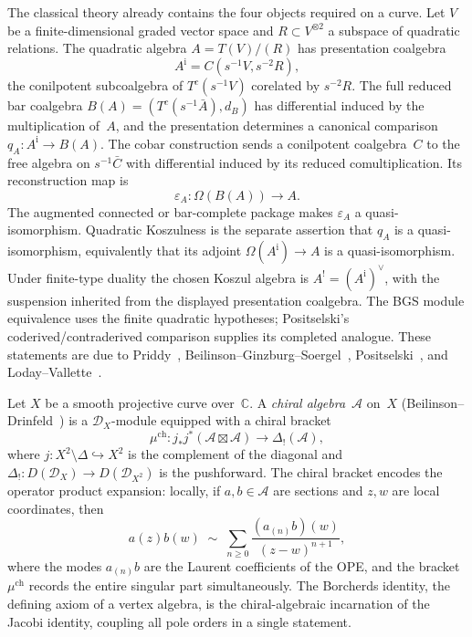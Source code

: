 \documentclass[11pt]{report}
\theoremstyle{definition}
\theoremstyle{remark}
\providecommand{\cA}{\mathcal{A}}
\numberwithin{equation}{section}
\begin{document}
The classical theory already contains the four objects required on a
curve.  Let $V$ be a finite-dimensional graded vector space and
$R\subset V^{\otimes2}$ a subspace of quadratic relations.  The
quadratic algebra $A=T(V)/(R)$ has presentation coalgebra
\[
A^{\mathrm i}=C(s^{-1}V,s^{-2}R),
\]
the conilpotent subcoalgebra of $T^c(s^{-1}V)$ corelated by
$s^{-2}R$.  The full reduced bar coalgebra
$B(A)=(T^c(s^{-1}\bar A),d_B)$ has differential induced by the
multiplication of~$A$, and the presentation determines a canonical
comparison $q_A\colon A^{\mathrm i}\to B(A)$.  The cobar
construction sends a conilpotent coalgebra~$C$ to the free algebra on
$s^{-1}\bar C$ with differential induced by its reduced
comultiplication.  Its reconstruction map is
\[
\varepsilon_A \colon \Omega(B(A)) \longrightarrow A.
\]
The augmented connected or bar-complete package makes
$\varepsilon_A$ a quasi-isomorphism.  Quadratic Koszulness is the
separate assertion that $q_A$ is a quasi-isomorphism, equivalently
that its adjoint $\Omega(A^{\mathrm i})\to A$ is a
quasi-isomorphism.  Under finite-type duality the chosen Koszul
algebra is $A^!=(A^{\mathrm i})^\vee$, with the suspension inherited
from the displayed presentation coalgebra.  The BGS module
equivalence uses the finite quadratic hypotheses; Positselski's
coderived/contraderived comparison supplies its completed analogue.
These statements are due to Priddy~\cite{Priddy70},
Beilinson--Ginzburg--Soergel~\cite{BGS96},
Positselski~\cite{Positselski11}, and
Loday--Vallette~\cite{LV12}.

Let $X$ be a smooth projective curve over~$\mathbb{C}$. A \emph{chiral algebra}~$\cA$ on~$X$ (Beilinson--Drinfeld~\cite{BD04}) is a $\mathcal{D}_X$-module equipped with a chiral bracket
\[
\mu^{\mathrm{ch}} \colon j_* j^*(\cA \boxtimes \cA) \longrightarrow \Delta_!(\cA),
\]
where $j \colon X^2 \setminus \Delta \hookrightarrow X^2$ is the complement of the diagonal and $\Delta_! \colon D(\mathcal{D}_X) \to D(\mathcal{D}_{X^2})$ is the pushforward. The chiral bracket encodes the operator product expansion: locally, if $a, b \in \cA$ are sections and $z, w$ are local coordinates, then
\[
a(z) b(w) \;\sim\; \sum_{n \geq 0} \frac{(a_{(n)} b)(w)}{(z - w)^{n+1}},
\]
where the modes $a_{(n)}b$ are the Laurent coefficients of the OPE, and the bracket $\mu^{\mathrm{ch}}$ records the entire singular part simultaneously. The Borcherds identity, the defining axiom of a vertex algebra, is the chiral-algebraic incarnation of the Jacobi identity, coupling all pole orders in a single statement.
\end{document}
